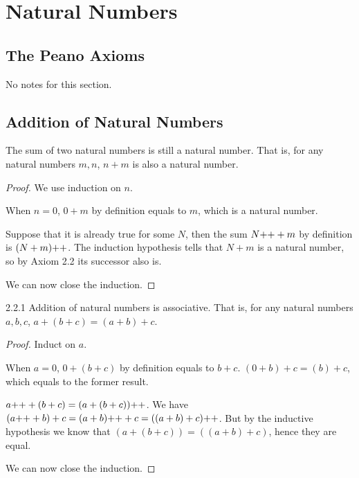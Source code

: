 
\setcounter{chapter}{1}
\chapter{Natural Numbers}
\section{The Peano Axioms}
No notes for this section.

\section{Addition of Natural Numbers}
\begin{why}{20}
The sum of two natural numbers is still a natural number. That is, for any natural numbers $m,n$, $n+m$ is also a natural number.
\end{why}
\begin{proof}
We use induction on $n$. 

\mybcbox When $n = 0$, $0 + m$ by definition equals to $m$, which is a natural number.

\myisbox Suppose that it is already true for some $N$, then the sum $N{+}{+} + m$ by definition is $(N+m){+}{+}$. The induction hypothesis tells that $N+m$ is a natural number, so by Axiom 2.2 its successor also is.

We can now close the induction.
\end{proof}

\begin{exercise}{2.2.1}
Addition of natural numbers is associative. That is, for any natural numbers $a,b,c$, $a+(b+c) = (a+b)+c$.	
\end{exercise}
\begin{proof}
Induct on $a$.

\mybcbox When $a = 0$, $0 + (b+c)$ by definition equals to $b+c$. $(0+b)+c = (b)+c$, which equals to the former result. 

\myisbox $a{+}{+}+(b+c) = (a+(b+c)){+}{+}$. We have $(a{+}{+}+b)+c = (a+b){+}{+}+c = ((a+b)+c){+}{+}$. But by the inductive hypothesis we know that $(a+(b+c)) = ((a+b)+c)$, hence they are equal.

We can now close the induction.
\end{proof}

